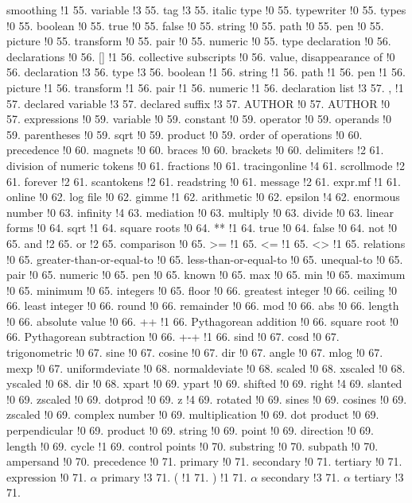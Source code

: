 smoothing !1 55.
variable !3 55.
tag !3 55.
italic type !0 55.
typewriter !0 55.
types !0 55.
boolean !0 55.
true !0 55.
false !0 55.
string !0 55.
path !0 55.
pen !0 55.
picture !0 55.
transform !0 55.
pair !0 55.
numeric !0 55.
type declaration !0 56.
declarations !0 56.
[] !1 56.
collective subscripts !0 56.
value, disappearance of !0 56.
declaration !3 56.
type !3 56.
boolean !1 56.
string !1 56.
path !1 56.
pen !1 56.
picture !1 56.
transform !1 56.
pair !1 56.
numeric !1 56.
declaration list !3 57.
, !1 57.
declared variable !3 57.
declared suffix !3 57.
AUTHOR !0 57.
AUTHOR !0 57.
expressions !0 59.
variable !0 59.
constant !0 59.
operator !0 59.
operands !0 59.
parentheses !0 59.
sqrt !0 59.
product !0 59.
order of operations !0 60.
precedence !0 60.
magnets !0 60.
braces !0 60.
brackets !0 60.
delimiters !2 61.
division of numeric tokens !0 61.
fractions !0 61.
tracingonline !4 61.
scrollmode !2 61.
forever !2 61.
scantokens !2 61.
readstring !0 61.
message !2 61.
expr.mf !1 61.
online !0 62.
log file !0 62.
gimme !1 62.
arithmetic !0 62.
epsilon !4 62.
enormous number !0 63.
infinity !4 63.
mediation !0 63.
multiply !0 63.
divide !0 63.
linear forms !0 64.
sqrt !1 64.
square roots !0 64.
** !1 64.
true !0 64.
false !0 64.
not !0 65.
and !2 65.
or !2 65.
comparison !0 65.
>= !1 65.
<= !1 65.
<> !1 65.
relations !0 65.
greater-than-or-equal-to !0 65.
less-than-or-equal-to !0 65.
unequal-to !0 65.
pair !0 65.
numeric !0 65.
pen !0 65.
known !0 65.
max !0 65.
min !0 65.
maximum !0 65.
minimum !0 65.
integers !0 65.
floor !0 66.
greatest integer !0 66.
ceiling !0 66.
least integer !0 66.
round !0 66.
remainder !0 66.
mod !0 66.
abs !0 66.
length !0 66.
absolute value !0 66.
++ !1 66.
Pythagorean addition !0 66.
square root !0 66.
Pythagorean subtraction !0 66.
+-+ !1 66.
sind !0 67.
cosd !0 67.
trigonometric !0 67.
sine !0 67.
cosine !0 67.
dir !0 67.
angle !0 67.
mlog !0 67.
mexp !0 67.
uniformdeviate !0 68.
normaldeviate !0 68.
scaled !0 68.
xscaled !0 68.
yscaled !0 68.
dir !0 68.
xpart !0 69.
ypart !0 69.
shifted !0 69.
right !4 69.
slanted !0 69.
zscaled !0 69.
dotprod !0 69.
z !4 69.
rotated !0 69.
sines !0 69.
cosines !0 69.
zscaled !0 69.
complex number !0 69.
multiplication !0 69.
dot product !0 69.
perpendicular !0 69.
product !0 69.
string !0 69.
point !0 69.
direction !0 69.
length !0 69.
cycle !1 69.
control points !0 70.
substring !0 70.
subpath !0 70.
ampersand !0 70.
precedence !0 71.
primary !0 71.
secondary !0 71.
tertiary !0 71.
expression !0 71.
$\alpha $ primary !3 71.
( !1 71.
) !1 71.
$\alpha $ secondary !3 71.
$\alpha $ tertiary !3 71.
